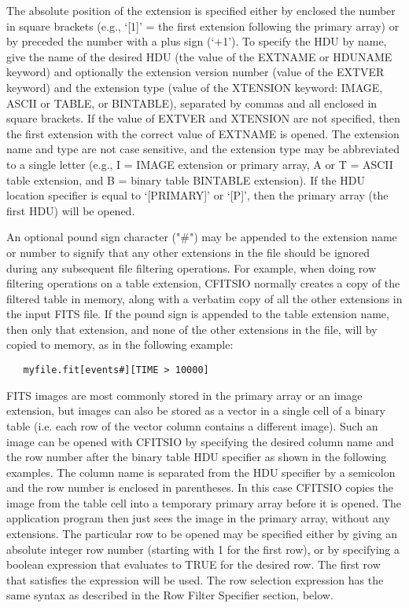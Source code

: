 \documentclass[11pt]{book}
\begin{document}
The absolute position of the extension is specified either by enclosed
the number in square brackets (e.g., `[1]' = the first extension
following the primary array) or by preceded the number with a plus sign
(`+1').  To specify the HDU by name, give the name of the desired HDU
(the value of the EXTNAME or HDUNAME keyword) and optionally the
extension version number (value of the EXTVER keyword) and the
extension type (value of the XTENSION keyword: IMAGE, ASCII or TABLE,
or BINTABLE), separated by commas and all enclosed in square brackets.
If the value of EXTVER and XTENSION are not specified, then the first
extension with the correct value of EXTNAME is opened. The extension
name and type are not case sensitive, and the extension type may be
abbreviated to a single letter (e.g., I = IMAGE extension or primary
array, A or T = ASCII table extension, and B = binary table BINTABLE
extension).   If the HDU location specifier is equal to `[PRIMARY]' or
`[P]', then the primary array (the first HDU) will be opened.

An optional pound sign character ("\#") may be appended to the extension
name or number to signify that any other extensions in the file should
be ignored during any subsequent file filtering operations.  For example,
when doing row filtering operations on a table extension, CFITSIO normally
creates a copy of the filtered table in memory, along with a verbatim
copy of all the other extensions in the input FITS file.  If the pound
sign is appended to the table extension name, then only that extension,
and none of the other extensions in the file, will by copied to memory,
as in the following example:

\begin{verbatim}
   myfile.fit[events#][TIME > 10000]
\end{verbatim}

FITS images are most commonly stored in the primary array or an image
extension, but images can also be stored as a vector in a single cell
of a binary table (i.e. each row of the vector column contains a
different image).  Such an image can be opened with CFITSIO by
specifying the desired column  name and the row number after the binary
table HDU specifier as shown in the following examples. The column name
is separated from the HDU specifier by a semicolon and the row number
is enclosed in parentheses.  In this case CFITSIO copies the image from
the table cell into a temporary primary array before it is opened.  The
application program then just sees the image in the primary array,
without any extensions.  The particular row to be opened may be
specified either by giving an absolute integer row number (starting
with 1 for the first row), or by specifying a boolean expression that
evaluates to TRUE for the desired row.  The first row that satisfies
the expression will be used.  The row selection expression has the same
syntax as described in the Row Filter Specifier section, below.
\end{document}
